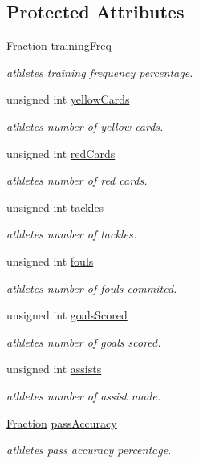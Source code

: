 \subsection*{Protected Attributes}
\begin{DoxyCompactItemize}
\item 
\hyperlink{class_fraction}{Fraction} \hyperlink{class_info_ae893be5aad319de5d911c3f80cc0a2d4}{training\+Freq}
\begin{DoxyCompactList}\small\item\em athlete\textquotesingle{}s training frequency percentage. \end{DoxyCompactList}\item 
unsigned int \hyperlink{class_info_aabdfdb282f3ceaae1772574bf2b3cd86}{yellow\+Cards}
\begin{DoxyCompactList}\small\item\em athlete\textquotesingle{}s number of yellow cards. \end{DoxyCompactList}\item 
unsigned int \hyperlink{class_info_a953c30accc7e6ff301542adfd5824f38}{red\+Cards}
\begin{DoxyCompactList}\small\item\em athlete\textquotesingle{}s number of red cards. \end{DoxyCompactList}\item 
unsigned int \hyperlink{class_info_aecdd57d96490b16a0c2590dd8f34009e}{tackles}
\begin{DoxyCompactList}\small\item\em athlete\textquotesingle{}s number of tackles. \end{DoxyCompactList}\item 
unsigned int \hyperlink{class_info_a2f90c84ba67c0e225dd58cdc14ab7f3d}{fouls}
\begin{DoxyCompactList}\small\item\em athlete\textquotesingle{}s number of fouls commited. \end{DoxyCompactList}\item 
unsigned int \hyperlink{class_info_a5ad5f72833856502b9c1f6ea50a98619}{goals\+Scored}
\begin{DoxyCompactList}\small\item\em athlete\textquotesingle{}s number of goals scored. \end{DoxyCompactList}\item 
unsigned int \hyperlink{class_info_a1c0340af11df3407946b0ffdaae28864}{assists}
\begin{DoxyCompactList}\small\item\em athlete\textquotesingle{}s number of assist made. \end{DoxyCompactList}\item 
\hyperlink{class_fraction}{Fraction} \hyperlink{class_info_a37ee53dc8ae9a9656206e7eb389c6392}{pass\+Accuracy}
\begin{DoxyCompactList}\small\item\em athlete\textquotesingle{}s pass accuracy percentage. \end{DoxyCompactList}\end{DoxyCompactItemize}

